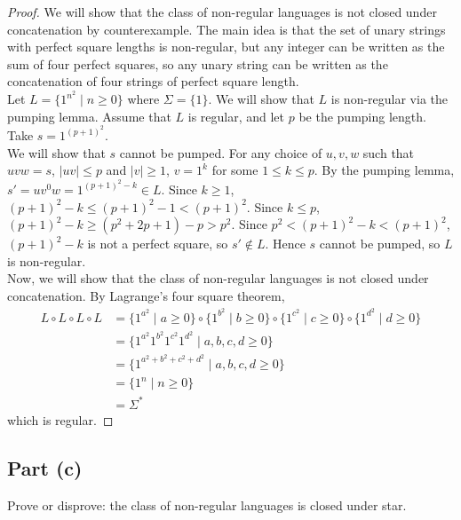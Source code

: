 \documentclass{article}
\begin{document}
\begin{proof}
    We will show that the class of non-regular languages is not closed under concatenation by counterexample. The main idea is that the set of unary strings 
    with perfect square lengths is non-regular, but any integer can be written as the sum of four perfect squares, so any unary string can be written as the 
    concatenation of four strings of perfect square length. \\

    \noindent
    Let $L = \{1^{n^2} \mid n \geq 0\}$ where $\Sigma = \{ 1 \}$. We will show that $L$ is non-regular via the pumping lemma. Assume that $L$ is regular, and
    let $p$ be the pumping length. Take $s = 1^{(p+1)^2}$. \\
    
    \noindent
    We will show that $s$ cannot be pumped. For any choice of $u,v,w$ such that $uvw = s$, $|uv| \leq p$ and $|v| \geq 1$, $v = 1^k$ for some $1 \leq k \leq p$.
    By the pumping lemma, $s' = uv^0w = 1^{(p+1)^2 - k} \in L$. Since $k \geq 1$, $(p+1)^2 - k \leq (p+1)^2 - 1 < (p+1)^2$. Since $k \leq p$, 
    $(p+1)^2 - k \geq (p^2 + 2p + 1) - p > p^2$. Since $p^2 < (p+1)^2 - k < (p+1)^2$, $(p+1)^2 - k$ is not a perfect square, so $s' \not \in L$. Hence $s$ 
    cannot be pumped, so $L$ is non-regular. \\

    \noindent
    Now, we will show that the class of non-regular languages is not closed under concatenation. By Lagrange's four square theorem, 
    \begin{align*}
        L \circ L \circ L \circ L &= \{1^{a^2} \mid a \geq 0 \} \circ\{1^{b^2} \mid b \geq 0 \} \circ \{1^{c^2} \mid c \geq 0 \} \circ \{1^{d^2} \mid d \geq 0 \} \\
        &= \{1^{a^2} 1^{b^2} 1^{c^2} 1^{d^2} \mid a, b, c, d \geq 0 \} \\
        &= \{1^{a^2 + b^2 + c^2 + d^2} \mid a, b, c, d \geq 0 \} \\
        &= \{1^n \mid n \geq 0\} \\
        &= \Sigma^*
    \end{align*}
    which is regular. 
\end{proof}

\subsection*{Part (c)}

Prove or disprove: the class of non-regular languages is closed under star.
\end{document}
